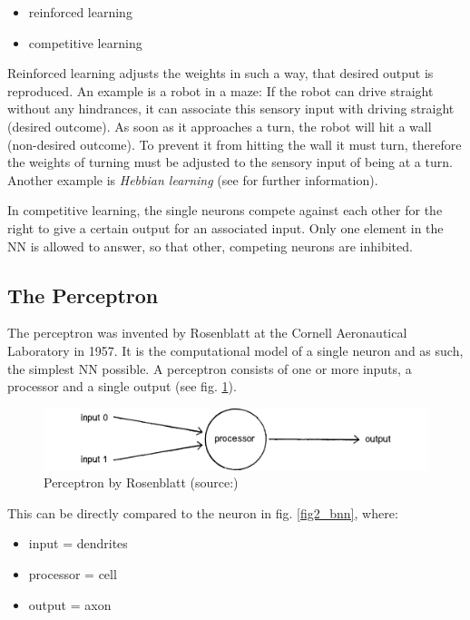 \begin{itemize}
	\item reinforced learning
	\item competitive learning
\end{itemize}

Reinforced learning adjusts the weights in such a way, that desired output is reproduced. An example is a robot in a maze: If the robot can drive straight without any hindrances, it can associate this sensory input with driving straight (desired outcome). As soon as it approaches a turn, the robot will hit a wall (non-desired outcome). To prevent it from hitting the wall it must turn, therefore the weights of turning must be adjusted to the sensory input of being at a turn. Another example is \emph{Hebbian learning} (see \cite{Rojas96} for further information).

In competitive learning, the single neurons compete against each other for the right to give a certain output for an associated input. Only one element in the NN is allowed to answer, so that other, competing neurons are inhibited\cite{Rojas96}.


\subsection{The Perceptron}
The perceptron was invented by Rosenblatt at the Cornell Aeronautical Laboratory in 1957\cite{Rosenblatt58}. It is the computational model of a single neuron and as such, the simplest NN possible\cite{Shiffman12}. A perceptron consists of one or more inputs, a processor and a single output (see fig. \ref{fig2_pereptron})\cite{Rosenblatt58}.

\begin{figure}[H]
	\begin{center}
		\includegraphics[scale=0.7]{img/perceptron.png}
		\caption{Perceptron by Rosenblatt (source:\cite{Shiffman12})}
		\label{fig2_pereptron}
	\end{center}
\end{figure}

This can be directly compared to the neuron in fig. \ref{fig2_bnn}, where:
\begin{itemize}
	\item input = dendrites
	\item processor = cell
	\item output = axon
\end{itemize}

